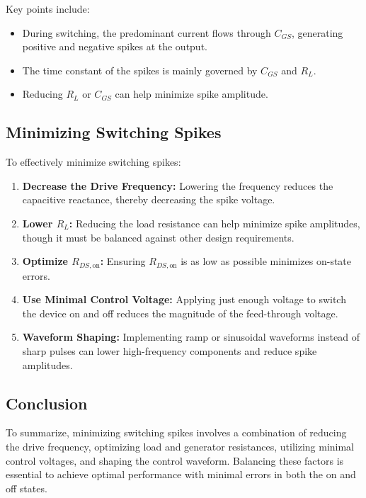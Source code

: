 Key points include:

\begin{itemize}
    \item During switching, the predominant current flows through \( C_{GS} \), generating positive and negative spikes at the output.
    
    \item The time constant of the spikes is mainly governed by \( C_{GS} \) and \( R_L \).
    
    \item Reducing \( R_L \) or \( C_{GS} \) can help minimize spike amplitude.
\end{itemize}

\subsection{Minimizing Switching Spikes}

To effectively minimize switching spikes:

\begin{enumerate}
    \item \textbf{Decrease the Drive Frequency:} Lowering the frequency reduces the capacitive reactance, thereby decreasing the spike voltage.
    
    \item \textbf{Lower \( R_L \):} Reducing the load resistance can help minimize spike amplitudes, though it must be balanced against other design requirements.
    
    \item \textbf{Optimize \( R_{DS,\text{on}} \):} Ensuring \( R_{DS,\text{on}} \) is as low as possible minimizes on-state errors.
    
    \item \textbf{Use Minimal Control Voltage:} Applying just enough voltage to switch the device on and off reduces the magnitude of the feed-through voltage.
    
    \item \textbf{Waveform Shaping:} Implementing ramp or sinusoidal waveforms instead of sharp pulses can lower high-frequency components and reduce spike amplitudes.
\end{enumerate}

\subsection{Conclusion}

To summarize, minimizing switching spikes involves a combination of reducing the drive frequency, optimizing load and generator resistances, utilizing minimal control voltages, and shaping the control waveform. Balancing these factors is essential to achieve optimal performance with minimal errors in both the on and off states.

